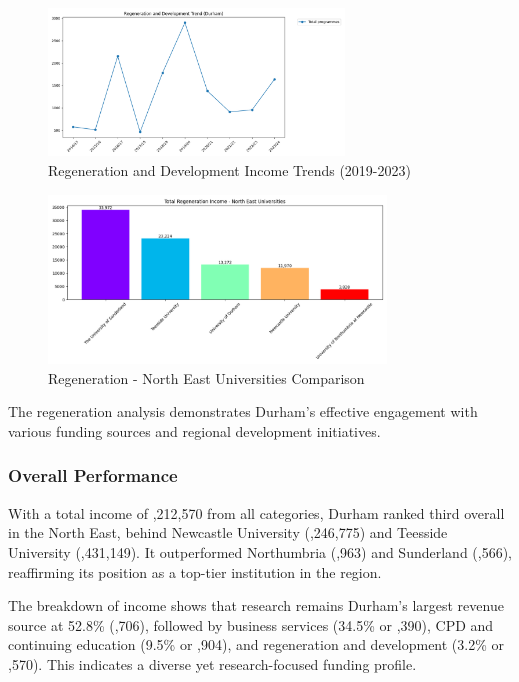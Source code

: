 \documentclass[journal,onecolumn, 10pt,draftclsnofoot]{IEEEtran}
\begin{document}
\begin{figure}[h]
\centering
\includegraphics[width=0.7\textwidth]{Fig/figure15.regeneration_time_trend.png}
\caption{Regeneration and Development Income Trends (2019-2023)}
\label{fig:regeneration-time-trend}
\end{figure}

\begin{figure}[h]
\centering
\includegraphics[width=0.8\textwidth]{Fig/figure16.regeneration_ne_comparison.png}
\caption{Regeneration - North East Universities Comparison}
\label{fig:regeneration-ne-comparison}
\end{figure}

The regeneration analysis demonstrates Durham's effective engagement with various funding sources and regional development initiatives.

\subsubsection{Overall Performance}

With a total income of ,212,570 from all categories, Durham ranked third overall in the North East, behind Newcastle University (,246,775) and Teesside University (,431,149). It outperformed Northumbria (,963) and Sunderland (,566), reaffirming its position as a top-tier institution in the region.

The breakdown of income shows that research remains Durham's largest revenue source at 52.8\% (,706), followed by business services (34.5\% or ,390), CPD and continuing education (9.5\% or ,904), and regeneration and development (3.2\% or ,570). This indicates a diverse yet research-focused funding profile.
\end{document}

